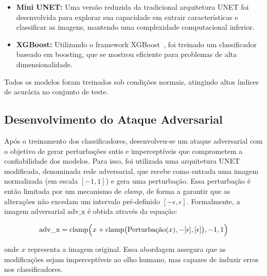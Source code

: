 \documentclass[12pt]{article}
\begin{document}
\begin{itemize}
  \item \textbf{Mini UNET:} Uma versão reduzida da tradicional arquitetura UNET foi desenvolvida para explorar sua capacidade em extrair características e classificar as imagens, mantendo uma complexidade computacional inferior.

  \item \textbf{XGBoost:} Utilizando o framework XGBoost~\cite{Chen_2016}, foi treinado um classificador baseado em boosting, que se mostrou eficiente para problemas de alta dimensionalidade.
\end{itemize}

Todos os modelos foram treinados sob condições normais, atingindo altos índices
de acurácia no conjunto de teste.

\subsection{Desenvolvimento do Ataque Adversarial}

Após o treinamento dos classificadores, desenvolveu-se um ataque adversarial
com o objetivo de gerar perturbações sutis e imperceptíveis que comprometem a
confiabilidade dos modelos. Para isso, foi utilizada uma arquitetura UNET
modificada, denominada rede adversarial, que recebe como entrada uma imagem
normalizada (em escala \([-1, 1]\)) e gera uma perturbação. Essa perturbação é
então limitada por um mecanismo de \textit{clamp}, de forma a garantir que as
alterações não excedam um intervalo pré-definido \([-\epsilon, \epsilon]\).
Formalmente, a imagem adversarial \( \text{adv\_x} \) é obtida através da
equação:

\[
  \text{adv\_x} = \text{clamp}\Bigl(x + \text{clamp}\bigl(\text{Perturbação}(x), -[\epsilon], [\epsilon]\bigr), -1, 1\Bigr)
\]

onde \( x \) representa a imagem original. Essa abordagem assegura que as
modificações sejam imperceptíveis ao olho humano, mas capazes de induzir erros
nos classificadores.
\end{document}
